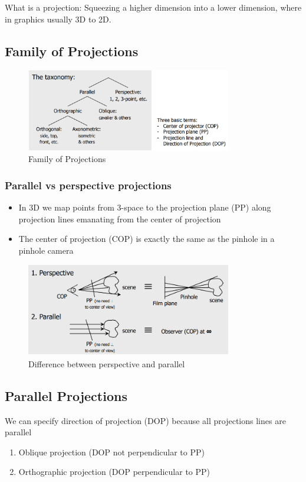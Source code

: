 \documentclass[11pt]{article}
\begin{document}
What is a projection:
Squeezing a higher dimension into a lower dimension, where in graphics usually 3D to 2D.


\subsection{Family of Projections}
\begin{figure}[h]
    \centering
    \includegraphics[width=0.8\textwidth]{fam_of_proj.png}
    \caption{Family of Projections}
    \label{fig:fam_of_proj}
\end{figure}
\subsubsection*{Parallel vs perspective projections}
\begin{itemize}
    \item In 3D we map points from 3-space to the projection plane (PP) along projection lines emanating from the center of projection
    \item The center of projection (COP) is exactly the same as the pinhole in a pinhole camera
\end{itemize}

\begin{figure}[h]
    \centering
    \includegraphics[width=0.8\textwidth]{par_vs_pers.png}
    \caption{Difference between perspective and parallel}
    \label{fig:par_vs_pers}
\end{figure}

\subsection{Parallel Projections}
We can specify direction of projection (DOP) because all projections lines are parallel
\begin{enumerate}
    \item Oblique projection (DOP not perpendicular to PP) 
    \item Orthographic projection (DOP perpendicular to PP)
\end{enumerate}
\end{document}
